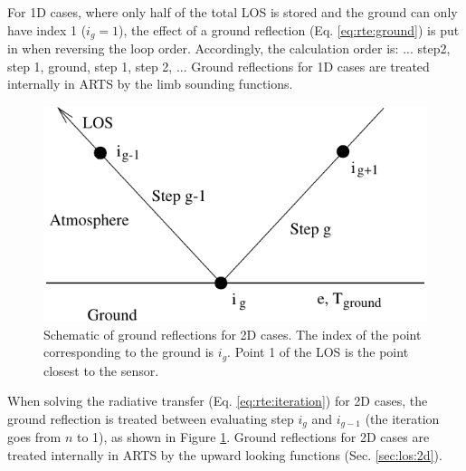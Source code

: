   For 1D cases, where only half of the total LOS is stored and the
  ground can only have index 1 ($i_g=1$), the effect of a ground
  reflection (Eq. \ref{eq:rte:ground}) is put in when reversing the
  loop order.  Accordingly, the calculation order is: ... step2, step
  1, ground, step 1, step 2, ... Ground reflections for 1D cases are
  treated internally in ARTS by the limb sounding functions.
  
  \begin{figure}[b]
   \begin{center}
     \includegraphics*[width=0.75\hsize]{Figs/ground}
    \caption{Schematic of ground reflections for 2D cases. The index 
             of the point corresponding to the ground is $i_g$. Point 1
             of the LOS is the point closest to the sensor. }  
    \label{fig:los1d:ground}  
   \end{center}
  \end{figure}
 
  When solving the radiative transfer (Eq. \ref{eq:rte:iteration}) for
  2D cases, the ground reflection is treated between evaluating step
  $i_g$ and $i_{g-1}$ (the iteration goes from $n$ to 1), as shown in
  Figure \ref{fig:los1d:ground}.  Ground reflections for 2D cases are
  treated internally in ARTS by the upward looking functions (Sec.
  \ref{sec:los:2d}).



